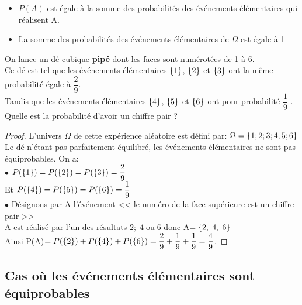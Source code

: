\begin{remark}
\begin{itemize}
\item $  P(A) $  est égale à la somme des probabilités des événements élémentaires qui réalisent A.
\item La somme des probabilités  des événements élémentaires  de $ \Omega $  est égale à 1   
\end{itemize}
\end{remark}

  \begin{example}


On lance un dé cubique  \textbf{pipé} dont les faces sont numérotées de 1 à  6. \\  Ce dé est tel que les événements élémentaires $ \left\{1\right\} $, $ \left\{2\right\} $ et $ \left\{3\right\} $ ont la même probabilité égale à $ \dfrac{2}{9} $.\\ Tandis que les événements élémentaires $ \left\{4\right\} $, $ \left\{5\right\} $ et $ \left\{6\right\} $  ont pour probabilité  $ \dfrac{1}{9} $ . \\ Quelle est la probabilité  d'avoir un chiffre pair ?
\end{example}

  
 \begin{proof}
L'univers $ \Omega  $ de cette expérience aléatoire est défini par: $ \Omega =\left\{1; 2; 3; 4; 5; 6 \right\}$\\Le dé n'étant pas parfaitement équilibré, les événements élémentaires ne sont pas équiprobables. On a: \\
$ \bullet $ $ P( \left\{1\right\})=P (\left\{2\right\})=P (\left\{3\right\})= \dfrac{2}{9}$\\
 
Et 
  $P( \left\{4\right\})= P( \left\{5\right\})=  P( \left\{6\right\})=\dfrac{1}{9} $   \\
  
 $ \bullet $ Désignons par A l'événement << le numéro de la face supérieure est un chiffre pair >>  \\ A  est réalisé par l'un des résultats $ 2; \; 4\;  \text{ou}\;  6 $   donc A$ =\left\{2, \; 4,\; 6\right\} $  \\
 
  Ainsi  P(A)$ =P( \left\{2\right\})+P (\left\{4\right\})+P (\left\{6\right\}) =\dfrac{2}{9}+\dfrac{1}{9}+\dfrac{1}{9}=\dfrac{4}{9}$.
\end{proof}
\subsection*{Cas où les événements élémentaires sont équiprobables}

